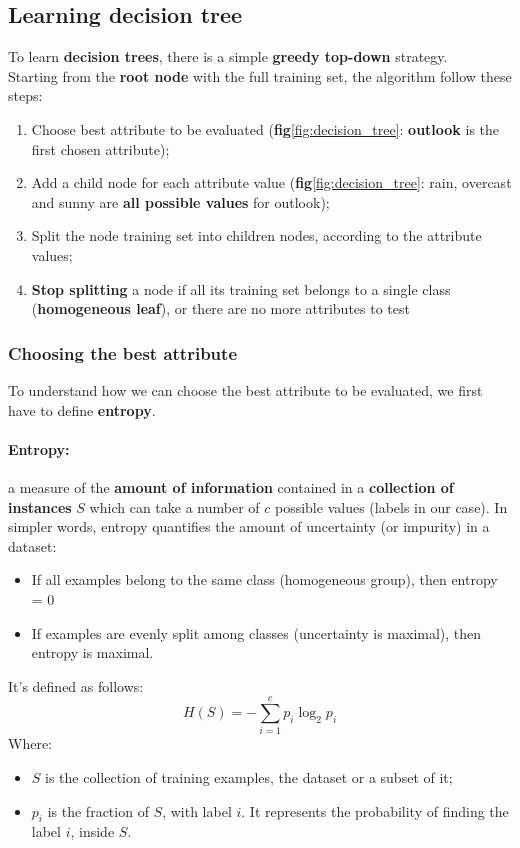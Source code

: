 \subsection{Learning decision tree}
To learn \textbf{decision trees}, there is a simple \textbf{greedy top-down} strategy. 
\\Starting from the \textbf{root node} with the full training set, the algorithm follow these steps:
\begin{enumerate}
    \item Choose best attribute to be evaluated (\textbf{fig}\ref{fig:decision_tree}: \textbf{outlook} is the first chosen attribute);
    \item Add a child node for each attribute value (\textbf{fig}\ref{fig:decision_tree}: rain, overcast and sunny are \textbf{all possible values} for outlook);
    \item Split the node training set into children nodes, according to the attribute values;
    \item \textbf{Stop splitting} a node if all its training set belongs to a single class (\textbf{homogeneous leaf}), or there are no more attributes to test
\end{enumerate}

\subsubsection{Choosing the best attribute}
To understand how we can choose the best attribute to be evaluated, we first have to define \textbf{entropy}.

\paragraph{Entropy:} a measure of the \textbf{amount of information} contained in a \textbf{collection of instances} $S$ 
which can take a number of $c$ possible values (labels in our case). 
In simpler words, entropy quantifies the amount of uncertainty (or impurity) in a dataset:
\begin{itemize}
    \item If all examples belong to the same class (homogeneous group), then entropy = 0
    \item If examples are evenly split among classes (uncertainty is maximal), then entropy is maximal.
\end{itemize}
It's defined as follows:
\begin{equation}
\label{eq:entropy}
    H(S) = - \sum^c_{i = 1} p_i \log_2 p_i
\end{equation}
Where:
\begin{itemize}
    \item $S$ is the collection of training examples, the dataset or a subset of it;
    \item $p_i$ is the fraction of $S$, with label $i$. 
    It represents the probability of finding the label $i$, inside $S$.
\end{itemize}

